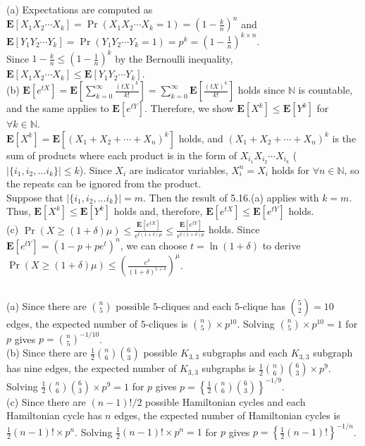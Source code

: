 \documentclass{article}
\begin{document}
\subsection{}
(a) Expectations are computed as $\textbf{E}[X_1X_2\cdots X_k]=\Pr(X_1X_2\cdots X_k=1)=(1-\frac{k}{n})^n$ 
and $\textbf{E}[Y_1Y_2\cdots Y_k]=\Pr(Y_1Y_2\cdots Y_k=1)=p^k=(1-\frac{1}{n})^{k\times n}$.\\
Since $1-\frac{k}{n}\leq (1-\frac{1}{n})^k$ by the Bernoulli inequality, $\textbf{E}[X_1X_2\cdots X_k]\leq \textbf{E}[Y_1Y_2\cdots Y_k]$.\\
(b) $\textbf{E}[e^{tX}]=\textbf{E}\left[\sum\limits_{k=0}^\infty\frac{(tX)^k}{k!}\right]=\sum\limits_{k=0}^\infty\textbf{E}[\frac{(tX)^k}{k!}]$
holds since $\mathbb{N}$ is countable, and the same applies to $\textbf{E}[e^{tY}]$.
Therefore, we show $\textbf{E}[X^k]\leq\textbf{E}[Y^k]$ for $\forall k\in \mathbb{N}$.\\
$\textbf{E}[X^k]=\textbf{E}[(X_1+X_2+\cdots+X_n)^k]$ holds, and $(X_1+X_2+\cdots+X_n)^k$ is the sum of products where each product is in the form of $X_{i_1}X_{i_2}\cdots X_{i_k}$ ($|\{i_1,i_2,...i_k\}|\leq k$).
Since $X_i$ are indicator variables, $X_i^n=X_i$ holds for $\forall n \in \mathbb{N}$, so the repeats can be ignored from the product.\\
Suppose that $|\{i_1,i_2,...i_k\}|=m$. Then the result of 5.16.(a) applies with $k=m$. Thus, $\textbf{E}[X^k]\leq\textbf{E}[Y^k]$ holds and, therefore, $\textbf{E}[e^{tX}]\leq\textbf{E}[e^{tY}]$ holds.\\
(c) $\Pr(X\geq(1+\delta)\mu)\leq\frac{\textbf{E}[e^{tX}]}{e^{t(1+\delta)\mu}}\leq\frac{\textbf{E}[e^{tY}]}{e^{t(1+\delta)\mu}}$ holds. 
Since $\textbf{E}[e^{tY}]=(1-p+pe^t)^n$, we can choose $t=\ln(1+\delta)$ to derive $\Pr(X\geq(1+\delta)\mu)\leq\left(\frac{e^\delta}{(1+\delta)^{1+\delta}}\right)^\mu$.
\subsection{}
(a) Since there are $\binom{n}{5}$ possible $5$-cliques and each $5$-clique has $\binom{5}{2}=10$ edges, the expected number of $5$-cliques is $\binom{n}{5}\times p^{10}$.
Solving $\binom{n}{5}\times p^{10}=1$ for $p$ gives $p=\binom{n}{5}^{-1/10}$.\\
(b) Since there are $\frac{1}{2}\binom{n}{6}\binom{6}{3}$ possible $K_{3,3}$ subgraphs and each $K_{3,3}$ subgraph has nine edges,
the expected number of $K_{3,3}$ subgraphs is $\frac{1}{2}\binom{n}{6}\binom{6}{3}\times p^9$.
Solving $\frac{1}{2}\binom{n}{6}\binom{6}{3}\times p^9=1$ for $p$ gives $p=\left\{\frac{1}{2}\binom{n}{6}\binom{6}{3}\right\}^{-1/9}$.\\
(c) Since there are $(n-1)!/2$ possible Hamiltonian cycles and each Hamiltonian cycle has $n$ edges,
the expected number of Hamiltonian cycles is $\frac{1}{2}(n-1)!\times p^n$.
Solving $\frac{1}{2}(n-1)!\times p^n=1$ for $p$ gives $p=\left\{\frac{1}{2}(n-1)!\right\}^{-1/n}$.
\subsection{}
\end{document}
